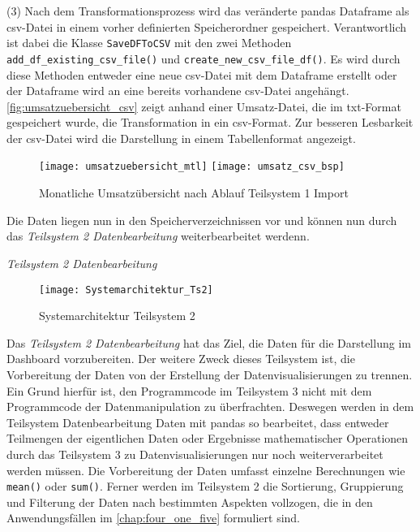     (3) Nach dem Transformationsprozess wird das veränderte pandas Dataframe als csv-Datei in einem vorher definierten Speicherordner gespeichert. 
    Verantwortlich ist dabei die Klasse \texttt{SaveDFToCSV} mit den zwei Methoden \texttt{add\_df\_existing\_csv\_file()} und 
    \texttt{create\_new\_csv\_file\_df()}. 
    Es wird durch diese Methoden entweder eine neue csv-Datei mit dem Dataframe erstellt oder der Dataframe wird an eine bereits vorhandene csv-Datei angehängt.
    \autoref{fig:umsatzuebersicht_csv} zeigt anhand einer Umsatz-Datei, die im txt-Format gespeichert wurde, die Transformation
    in ein csv-Format. Zur besseren Lesbarkeit der csv-Datei wird die Darstellung in einem Tabellenformat angezeigt.

    \begin{figure}[H]
        \centering
            \texttt{[image: umsatzuebersicht\_mtl]}
            \texttt{[image: umsatz\_csv\_bsp]}
            \caption{Monatliche Umsatzübersicht nach Ablauf Teilsystem 1 Import}
            \label{fig:umsatzuebersicht_csv}
    \end{figure}

    Die Daten liegen nun in den Speicherverzeichnissen vor und können nun durch das \textit{Teilsystem 2 Datenbearbeitung} 
    weiterbearbeitet werdenn.
    
    \clearpage
    \noindent
    \textit{Teilsystem 2 Datenbearbeitung}

    \begin{figure}[H]
        \centering
            \texttt{[image: Systemarchitektur\_Ts2]}
            \caption{Systemarchitektur Teilsystem 2}
            \label{fig:Systemarchitektur Teilsystem 2}
    \end{figure}

    Das \textit{Teilsystem 2 Datenbearbeitung} hat das Ziel, die Daten für die Darstellung im Dashboard vorzubereiten. Der weitere Zweck dieses
    Teilsystem ist, die Vorbereitung der Daten von der Erstellung der Datenvisualisierungen zu trennen. Ein Grund hierfür
    ist, den Programmcode im Teilsystem 3 nicht mit dem Programmcode der Datenmanipulation zu überfrachten. 
    Deswegen werden in dem Teilsystem Datenbearbeitung Daten mit pandas so bearbeitet, 
    dass entweder Teilmengen der eigentlichen Daten oder Ergebnisse mathematischer Operationen durch das Teilsystem 3 
    zu Datenvisualisierungen nur noch weiterverarbeitet werden müssen. Die Vorbereitung der Daten umfasst einzelne Berechnungen 
    wie \texttt{mean()} oder \texttt{sum()}. Ferner werden im Teilsystem 2 die Sortierung, Gruppierung und Filterung der 
    Daten nach bestimmten Aspekten vollzogen, die in den Anwendungsfällen im \autoref{chap:four_one_five} formuliert sind.
    
